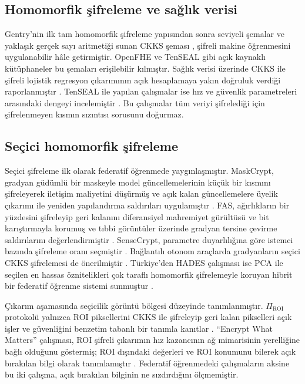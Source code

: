 \subsection{Homomorfik şifreleme ve sağlık verisi}\label{lit:he}

Gentry'nin ilk tam homomorfik şifreleme yapısından \cite{gentry2009fhe} sonra seviyeli şemalar \cite{brakerski2012leveled} ve yaklaşık gerçek sayı aritmetiği sunan CKKS şeması \cite{cheon2017ckks}, şifreli makine öğrenmesini uygulanabilir hâle getirmiştir. OpenFHE \cite{badawi2022openfhe} ve TenSEAL \cite{benaissa2021tenseal} gibi açık kaynaklı kütüphaneler bu şemaları erişilebilir kılmıştır. Sağlık verisi üzerinde CKKS ile şifreli lojistik regresyon çıkarımının açık hesaplamaya yakın doğruluk verdiği raporlanmıştır \cite{kahya2022fheml}. TenSEAL ile yapılan çalışmalar ise hız ve güvenlik parametreleri arasındaki dengeyi incelemiştir \cite{whiting2025tenseal}. Bu çalışmalar tüm veriyi şifrelediği için şifrelenmeyen kısmın sızıntısı sorusunu doğurmaz.

\subsection{Seçici homomorfik şifreleme}\label{lit:selective}

Seçici şifreleme ilk olarak federatif öğrenmede yaygınlaşmıştır. MaskCrypt, gradyan güdümlü bir maskeyle model güncellemelerinin küçük bir kısmını şifreleyerek iletişim maliyetini düşürmüş ve açık kalan güncellemelere üyelik çıkarımı ile yeniden yapılandırma saldırıları uygulamıştır \cite{hu2025maskcrypt}. FAS, ağırlıkların bir yüzdesini şifreleyip geri kalanını diferansiyel mahremiyet gürültüsü ve bit karıştırmayla korumuş ve tıbbi görüntüler üzerinde gradyan tersine çevirme saldırılarını değerlendirmiştir \cite{korkmaz2025fas}. SenseCrypt, parametre duyarlılığına göre istemci bazında şifreleme oranı seçmiştir \cite{li2025sensecrypt}. Bağlantılı otonom araçlarda gradyanların seçici CKKS şifrelemesi de önerilmiştir \cite{najjar2025cavs}. Türkiye'den HADES çalışması ise PCA ile seçilen en hassas öznitelikleri çok taraflı homomorfik şifrelemeyle koruyan hibrit bir federatif öğrenme sistemi sunmuştur \cite{kaynak2026hades}.

Çıkarım aşamasında seçicilik görüntü bölgesi düzeyinde tanımlanmıştır. $\Pi_{\mathrm{ROI}}$ protokolü yalnızca ROI piksellerini CKKS ile şifreleyip geri kalan pikselleri açık işler ve güvenliğini benzetim tabanlı bir tanımla kanıtlar \cite{bakas2026roi}. ``Encrypt What Matters'' çalışması, ROI şifreli çıkarımın hız kazancının ağ mimarisinin yerelliğine bağlı olduğunu göstermiş; ROI dışındaki değerleri ve ROI konumunu bilerek açık bırakılan bilgi olarak tanımlamıştır \cite{backour2026encrypt}. Federatif öğrenmedeki çalışmaların aksine bu iki çalışma, açık bırakılan bilginin ne sızdırdığını ölçmemiştir.

